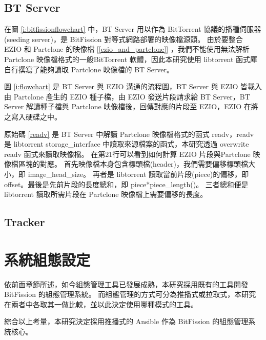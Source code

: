 \subsection{BT Server}

在圖 \ref{i:bitfissionflowchart} 中，BT Server 用以作為 BitTorrent 協議的播種伺服器(seeding server)，是 BitFission 對等式網路部署的映像檔源頭。
由於要整合 EZIO 和 Partclone 的映像檔 [\ref{ezio_and_partclone}] ，我們不能使用無法解析 Partclone 映像檔格式的一般BitTorrent 軟體，因此本研究使用 libtorrent 函式庫自行撰寫了能夠讀取 Partclone 映像檔的 BT Server。

圖 \ref{i:flowchart} 是 BT Server 與 EZIO 溝通的流程圖，BT Server 與 EZIO 皆載入由 Partclone 產生的 EZIO 種子檔，由 EZIO 發送片段請求給 BT Server，BT Server 解讀種子檔與 Partclone 映像檔後，回傳對應的片段至 EZIO，EZIO 在將之寫入硬碟之中。

原始碼 \ref{readv} 是 BT Server 中解讀 Partclone 映像檔格式的函式 readv，readv 是 libtorrent storage\_interface 中讀取來源檔案的函式，本研究透過 overwrite readv 函式來讀取映像檔。
在第21行可以看到如何計算 EZIO 片段與Partclone 映像檔區塊的對應。
首先映像檔本身包含標頭檔(header)，我們需要偏移標頭檔大小，即 image\_head\_size。
再者是 libtorrent 讀取當前片段(piece)的偏移，即 offset。最後是先前片段的長度總和，即 piece*piece\_length()。
三者總和便是 libtorrent 讀取所需片段在 Partclone 映像檔上需要偏移的長度。



\subsection{Tracker}

\section{系統組態設定}
依前面章節所述，如今組態管理工具已發展成熟，本研究採用既有的工具開發 BitFission 的組態管理系統。
而組態管理的方式可分為推播式或拉取式，本研究在兩者中各取其一做比較，並以此決定使用哪種模式的工具。


綜合以上考量，本研究決定採用推播式的 Ansible 作為 BitFission 的組態管理系統核心。

